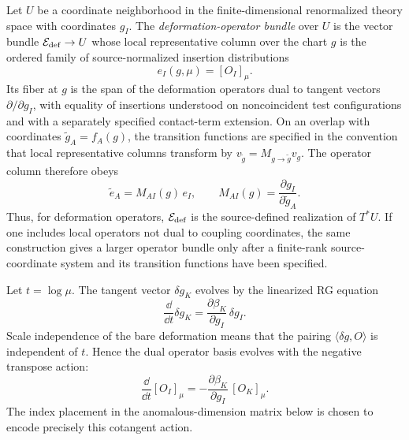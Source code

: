 \begin{definition}
\label{def:deformation-operator-bundle}
Let \(U\) be a coordinate neighborhood in the finite-dimensional
renormalized theory space with coordinates \(g_I\).  The
\emph{deformation-operator bundle} over \(U\) is the vector bundle
\(\mathcal E_{\rm def}\to U\) whose local representative column over the chart
\(g\) is the ordered family of source-normalized insertion distributions
\[
  e_I(g,\mu)=[O_I]_\mu .
\]
Its fiber at \(g\) is the span of the deformation operators dual to tangent
vectors \(\partial/\partial g_I\), with equality of insertions understood on
noncoincident test configurations and with a separately specified contact-term
extension.  On an overlap with coordinates \(\widetilde g_A=f_A(g)\), the
transition functions are specified in the convention that local representative
columns transform by \(v_{\widetilde g}=M_{g\to\widetilde g}v_g\).  The
operator column therefore obeys
\begin{equation}
  \widetilde e_A
  =
  M_{AI}(g)\,e_I,
  \qquad
  M_{AI}(g)=\frac{\partial g_I}{\partial\widetilde g_A}.
  \label{eq:deformation-operator-bundle-transition}
\end{equation}
Thus, for deformation operators, \(\mathcal E_{\rm def}\) is the source-defined
realization of \(T^*U\).  If one includes local operators not dual to coupling
coordinates, the same construction gives a larger operator bundle only after a
finite-rank source-coordinate system and its transition functions have been specified.
\end{definition}

Let \(t=\log\mu\).  The tangent vector \(\delta g_K\) evolves by the
linearized RG equation
\[
  \frac{\dd}{\dd t}\delta g_K
  =
  \frac{\partial\beta_K}{\partial g_I}\,\delta g_I .
\]
Scale independence of the bare deformation means that the pairing
\(\langle\delta g,O\rangle\) is independent of \(t\).  Hence the dual operator
basis evolves with the negative transpose action:
\[
  \frac{\dd}{\dd t}[O_I]_\mu
  =
  -
  \frac{\partial\beta_K}{\partial g_I}\,[O_K]_\mu .
\]
The index placement in the anomalous-dimension matrix below is chosen to
encode precisely this cotangent action.

